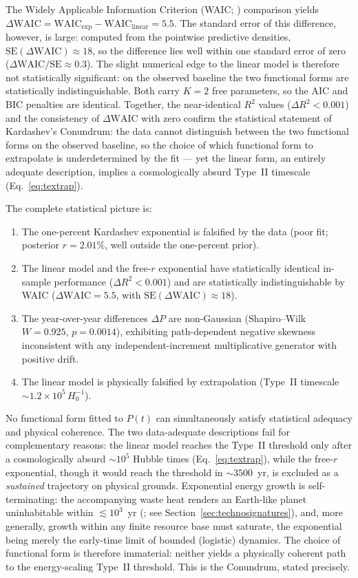 The Widely Applicable Information Criterion (WAIC; \citealp{Watanabe2010}) comparison
yields $\Delta\mathrm{WAIC} = \mathrm{WAIC}_{\mathrm{exp}} - \mathrm{WAIC}_{\mathrm{linear}} = 5.5$.
The standard error of this difference, however, is large: computed from the pointwise
predictive densities, $\mathrm{SE}(\Delta\mathrm{WAIC})\approx18$, so the difference lies
well within one standard error of zero ($\Delta\mathrm{WAIC}/\mathrm{SE}\approx0.3$). The
slight numerical edge to the linear model is therefore not statistically significant: on
the observed baseline the two functional forms are statistically indistinguishable. Both
carry $K=2$ free parameters, so the AIC and BIC penalties are identical. Together, the
near-identical $R^2$ values ($\Delta R^2<0.001$) and the consistency of
$\Delta\mathrm{WAIC}$ with zero confirm the statistical statement of Kardashev's Conundrum:
the data cannot distinguish between the two functional forms on the observed baseline, so
the choice of which functional form to extrapolate is underdetermined by the fit --- yet
the linear form, an entirely adequate description, implies a cosmologically absurd Type~II
timescale (Eq.~\ref{eq:textrap}).

The complete statistical picture is:
\begin{enumerate}
\item The one-percent Kardashev exponential is falsified by the data (poor fit; posterior
$r=2.01\%$, well outside the one-percent prior).
\item The linear model and the free-$r$ exponential have statistically identical
in-sample performance ($\Delta R^2 < 0.001$) and are statistically indistinguishable by
WAIC ($\Delta\mathrm{WAIC}=5.5$, with $\mathrm{SE}(\Delta\mathrm{WAIC})\approx18$).
\item The year-over-year differences $\Delta P$ are non-Gaussian (Shapiro--Wilk
$W=0.925$, $p=0.0014$), exhibiting path-dependent negative skewness inconsistent with any
independent-increment multiplicative generator with positive drift.
\item The linear model is physically falsified by extrapolation (Type~II timescale
$\sim1.2\times10^{5}\,H_0^{-1}$).
\end{enumerate}
No functional form fitted to $P(t)$ can simultaneously satisfy statistical adequacy and
physical coherence. The two data-adequate descriptions fail for complementary reasons: the
linear model reaches the Type~II threshold only after a cosmologically absurd
$\sim10^5$ Hubble times (Eq.~\ref{eq:textrap}), while the free-$r$ exponential, though it
would reach the threshold in $\sim3500$~yr, is excluded as a \emph{sustained} trajectory on
physical grounds. Exponential energy growth is self-terminating: the accompanying waste
heat renders an Earth-like planet uninhabitable within $\lesssim10^3$~yr
(\citealp{BalbiLingam2025}; see Section~\ref{sec:technosignatures}), and, more generally,
growth within any finite resource base must saturate, the exponential being merely the
early-time limit of bounded (logistic) dynamics. The choice of functional form is therefore
immaterial: neither yields a physically coherent path to the energy-scaling Type~II
threshold. This is the Conundrum, stated precisely.

